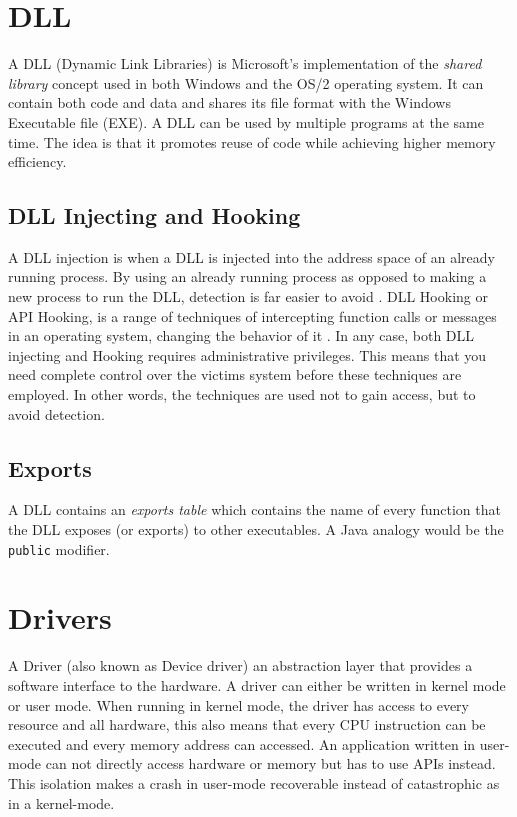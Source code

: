 \documentclass[11pt,english,a4paper]{report}
\begin{document}
\section{DLL}
A DLL (Dynamic Link Libraries) is Microsoft's implementation of the \textit{shared library} concept used in both Windows and the OS/2 operating system. It can contain both code and data and shares its file format with the Windows Executable file (EXE). A DLL can be used by multiple programs at the same time. The idea is that it promotes reuse of code while achieving higher memory efficiency.

\subsection{DLL Injecting and Hooking} \label{DLL_HOOKING}
A DLL injection is when a DLL is injected into the address space of an already running process. By using an already running process as opposed to making a new process to run the DLL, detection is far easier to avoid \cite{DEJAN_HOOK}. DLL Hooking or API Hooking, is a range of techniques of intercepting function calls or messages in an operating system, changing the behavior of it \cite{BREMER_HOOK}. In any case, both DLL injecting and Hooking requires administrative privileges. This means that you need complete control over the victims system before these techniques are employed. In other words, the techniques are used not to gain access, but to avoid detection. 

\subsection{Exports} \label{EXPORTS}
A DLL contains an \textit{exports table} which contains the name of every function that the DLL exposes (or exports) to other executables. A Java analogy would be the \texttt{public} modifier.

\section{Drivers}
A Driver (also known as Device driver) an abstraction layer that provides a software interface to the hardware. A driver can either be written in kernel mode or user mode. When running in kernel mode, the driver has access to every resource and all hardware, this also means that every CPU instruction can be executed and every memory address can accessed. An application written in user-mode can not directly access hardware or memory but has to use APIs instead. This isolation makes a crash in user-mode recoverable instead of catastrophic as in a kernel-mode.
\end{document}
